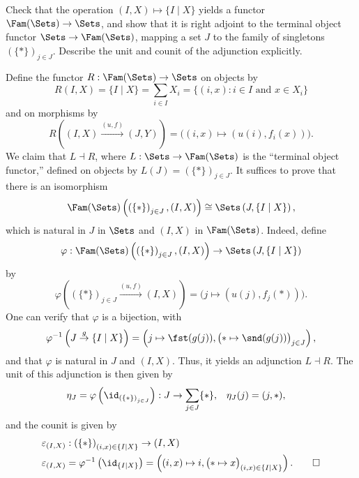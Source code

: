 \begin{exercise}
Check that the operation \((I, X) \mapsto \{I \mid X\}\) yields a functor \(\Fam(\Sets) \to \Sets\), and show that it is right adjoint to the terminal object functor \(\Sets \to \Fam(\Sets)\), mapping a set \(J\) to the family of singletons \((\{*\})_{j \in J}\).
Describe the unit and counit of the adjunction explicitly.
\end{exercise}

\begin{solution}
Define the functor \(R : \Fam(\Sets) \to \Sets\) on objects by
\begin{equation*}
R(I, X) = \{I \mid X\} = \sum_{i \in I} X_i = \big\{(i, x) : \text{\(i \in I\) and \(x \in X_i\)}\big\}
\end{equation*}
and on morphisms by
\begin{equation*}
R\left((I, X) \xrightarrow{(u, f)} (J, Y)\right)
= \big((i, x) \mapsto (u(i), f_i(x))\big).
\end{equation*}
We claim that \(L \dashv R\), where \(L : \Sets \to \Fam(\Sets)\) is the ``terminal object functor,'' defined on objects by \(L(J) = \left(\{*\}\right)_{j \in J}\).
It suffices to prove that there is an isomorphism
\begin{equation*}
\Fam(\Sets)\left(\left(\{*\}\right)_{j \in J}, (I, X)\right)
\cong \Sets\left(J, \{I \mid X\}\right),
\end{equation*}
which is natural in \(J\) in \(\Sets\) and \((I, X)\) in \(\Fam(\Sets)\).
Indeed, define
\begin{equation*}
\varphi : \Fam(\Sets)\left(\left(\{*\}\right)_{j \in J}, (I, X)\right)
\to \Sets\left(J, \{I \mid X\}\right)
\end{equation*}
by
\begin{equation*}
\varphi\left(\left(\{*\}\right)_{j \in J} \xrightarrow{(u, f)} (I, X)\right)
= \big(j \mapsto (u(j), f_j(*))\big).
\end{equation*}
One can verify that \(\varphi\) is a bijection, with
\begin{equation*}
\varphi^{-1}\left(J \overset{g}{\to} \{I \mid X\}\right)
= \left(j \mapsto \fst (g(j)) , \big(* \mapsto \snd(g(j))\big)_{j \in J}\right),
\end{equation*}
and that \(\varphi\) is natural in \(J\) and \((I, X)\).
Thus, it yields an adjunction \(L \dashv R\).
The unit of this adjunction is then given by
\begin{align*}
\eta_J &= \varphi\left(\id_{\left(\{*\}\right)_{j \in J}}\right): J \to \sum_{j \in J} \{*\}, &
\eta_J(j) &= (j, *),
\end{align*}
and the counit is given by
\begin{align*}
\varepsilon_{(I, X)}
&: \left(\{*\}\right)_{(i, x) \in \{I \mid X\}} \to (I , X) \\
\varepsilon_{(I, X)}
&= \varphi^{-1}\left(\id_{\{I \mid X\}}\right)
= \left((i, x) \mapsto i, \big(* \mapsto x\big)_{(i, x) \in \{I \mid X\}}\right).
\qedhere
\end{align*}
\end{solution}